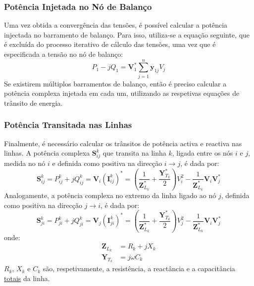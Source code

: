 %
\subsubsection{Potência Injetada no Nó de Balanço}

Uma vez obtida a convergência das tensões, é possível calcular a potência injectada no barramento de balanço. Para isso, utiliza-se a equação seguinte, que é excluída do processo iterativo de cálculo das tensões, uma vez que é especificada a tensão no nó de balanço:
$$
    P_1 - jQ_1 = \mathbf{V}_1^* \sum_{j=1}^{n} \mathbf{y}_{1j} V_j
$$
Se existirem múltiplos barramentos de balanço, então é preciso calcular a potência complexa injetada em cada um, utilizando as respetivas equações de trânsito de energia.

%
\subsubsection{Potência Transitada nas Linhas}
\label{subsubsec:potencia-transitada}

Finalmente, é necessário calcular os trânsitos de potência activa e reactiva nas linhas. A potência complexa \( \mathbf{S}^k_{ij} \) que transita na linha \( k \), ligada entre os nós \( i \) e \( j \), medida no nó \( i \) e definida como positiva na direcção \( i \rightarrow j \), é dada por:
$$
    \mathbf{S}^k_{ij} = P^k_{ij} + j Q^k_{ij} = \mathbf{V}_i (\mathbf{I}^k_{ij})^* = \left( \frac{1}{\mathbf{Z}^*_{L_k}} + \frac{\mathbf{Y}^*_{T_k}}{2} \right) V^2_i - \frac{1}{\mathbf{Z}^*_{L_k}} \mathbf{V}_i \mathbf{V}^*_j
$$
Analogamente, a potência complexa no extremo da linha ligado ao nó \( j \), definida como positiva na direcção \( j \rightarrow i \), é dada por:
$$
    \mathbf{S}^k_{ji} = P^k_{ji} + j Q^k_{ji} = \mathbf{V}_j (\mathbf{I}^k_{ji})^* = \left( \frac{1}{\mathbf{Z}^*_{L_k}} + \frac{\mathbf{Y}^*_{T_k}}{2} \right) V^2_j - \frac{1}{\mathbf{Z}^*_{L_k}} \mathbf{V}_i \mathbf{V}^*_j
$$
onde:
$$
    \begin{aligned}
        \mathbf{Z}_{L_k} &= R_k + jX_k  \\
        \mathbf{Y}_{T_k} &= j\omega C_k 
    \end{aligned}
$$
\( R_k \), \( X_k \) e \( C_k \) são, respetivamente, a resistência, a reactância e a capacitância \underline{totais} da linha.

